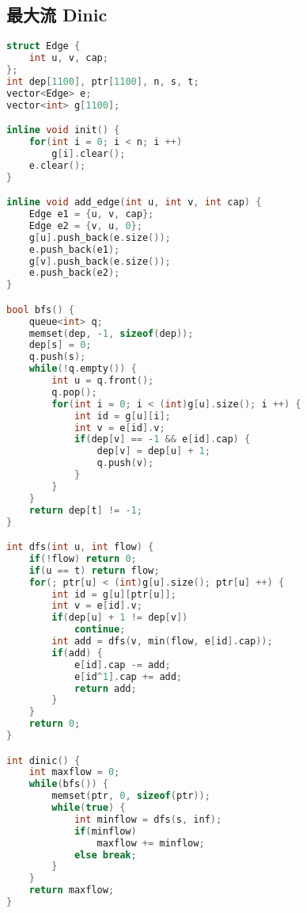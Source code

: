 \subsection{最大流 Dinic}
    \begin{lstlisting}[language=c++]
struct Edge {
    int u, v, cap;
};
int dep[1100], ptr[1100], n, s, t;
vector<Edge> e;
vector<int> g[1100];

inline void init() {
    for(int i = 0; i < n; i ++)
        g[i].clear();
    e.clear();
}

inline void add_edge(int u, int v, int cap) {
    Edge e1 = {u, v, cap};
    Edge e2 = {v, u, 0};
    g[u].push_back(e.size());
    e.push_back(e1);
    g[v].push_back(e.size());
    e.push_back(e2);
}

bool bfs() {
    queue<int> q;
    memset(dep, -1, sizeof(dep));
    dep[s] = 0;
    q.push(s);
    while(!q.empty()) {
        int u = q.front();
        q.pop();
        for(int i = 0; i < (int)g[u].size(); i ++) {
            int id = g[u][i];
            int v = e[id].v;
            if(dep[v] == -1 && e[id].cap) {
                dep[v] = dep[u] + 1;
                q.push(v);
            }
        }
    }
    return dep[t] != -1;
}

int dfs(int u, int flow) {
    if(!flow) return 0;
    if(u == t) return flow;
    for(; ptr[u] < (int)g[u].size(); ptr[u] ++) {
        int id = g[u][ptr[u]];
        int v = e[id].v;
        if(dep[u] + 1 != dep[v])
            continue;
        int add = dfs(v, min(flow, e[id].cap));
        if(add) {
            e[id].cap -= add;
            e[id^1].cap += add;
            return add;
        }
    }
    return 0;
}

int dinic() {
    int maxflow = 0;
    while(bfs()) {
        memset(ptr, 0, sizeof(ptr));
        while(true) {
            int minflow = dfs(s, inf);
            if(minflow)
                maxflow += minflow;
            else break;
        }
    }
    return maxflow;
}
    \end{lstlisting}
